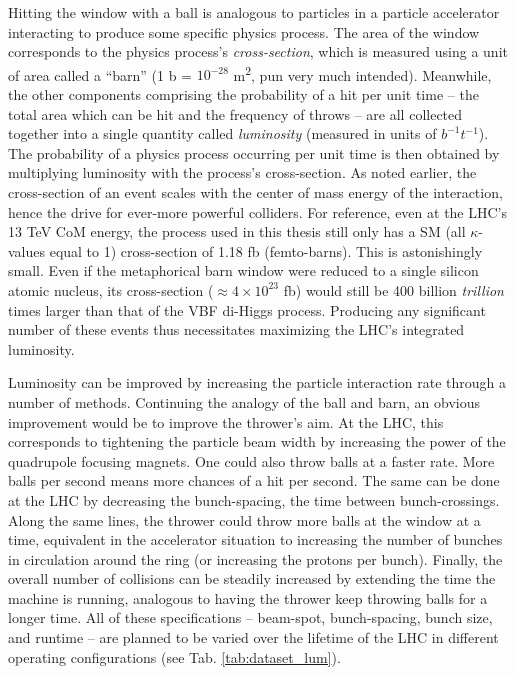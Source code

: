     Hitting the window with a ball is analogous to particles in a particle accelerator interacting to produce some specific physics process.
    The area of the window corresponds to the physics process's \textit{cross-section}, which is measured using a unit of area called a ``barn'' (1 b = $10^{-28}$ m\textsuperscript{2}, pun very much intended).
    Meanwhile, the other components comprising the probability of a hit per unit time
        -- the total area which can be hit and the frequency of throws --
        are all collected together into a single quantity called \textit{luminosity} (measured in units of $b^{-1}t^{-1}$). 
    The probability of a physics process occurring per unit time is then obtained by multiplying luminosity with the process's cross-section.
    As noted earlier, the cross-section of an event scales with the center of mass energy of the interaction,
        hence the drive for ever-more powerful colliders.
    For reference, even at the LHC's 13 TeV CoM energy,
        the \vbfhhproc process used in this thesis still only has a SM (all $\kappa$-values equal to 1) cross-section of 1.18 fb (femto-barns).
    This is astonishingly small.
    Even if the metaphorical barn window were reduced to a single silicon atomic nucleus,
        its cross-section ($\approx 4 \times 10^{23}$ fb)
        would still be 400 billion \textit{trillion} times larger than that of the VBF di-Higgs process.
    Producing any significant number of these events thus necessitates maximizing the LHC's integrated luminosity.

    Luminosity can be improved by increasing the particle interaction rate through a number of methods.
    Continuing the analogy of the ball and barn, an obvious improvement would be to improve the thrower's aim.
    At the LHC, this corresponds to tightening the particle beam width by increasing the power of the quadrupole focusing magnets.
    One could also throw balls at a faster rate.
    More balls per second means more chances of a hit per second.
    The same can be done at the LHC by decreasing the bunch-spacing, the time between bunch-crossings.
    Along the same lines, the thrower could throw more balls at the window at a time,
        equivalent in the accelerator situation to increasing the number of bunches in circulation around the ring
        (or increasing the protons per bunch).
    Finally, the overall number of collisions can be steadily increased by extending the time the machine is running, analogous to having the thrower keep throwing balls for a longer time.
    All of these specifications -- beam-spot, bunch-spacing, bunch size, and runtime -- are planned to be varied over the lifetime of the LHC in different operating configurations (see Tab. \ref{tab:dataset_lum}).
    
